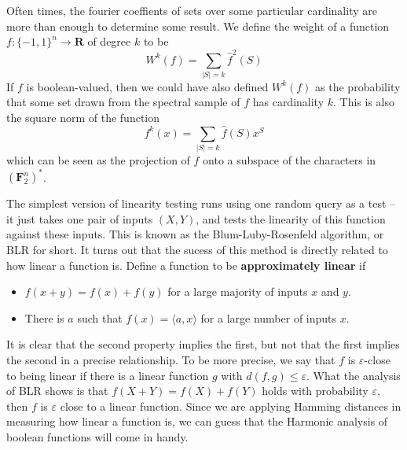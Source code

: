 Often times, the fourier coeffients of sets over some particular cardinality are more than enough to determine some result. We define the weight of a function $f: \{ -1, 1 \}^n \to \mathbf{R}$ of degree $k$ to be
%
\[ W^k(f) = \sum_{|S| = k} \widehat{f}^2(S) \]
%
If $f$ is boolean-valued, then we could have also defined $W^k(f)$ as the probability that some set drawn from the spectral sample of $f$ has cardinality $k$. This is also the square norm of the function
%
\[ f^k(x) = \sum_{|S| = k} \widehat{f}(S) x^S \]
%
which can be seen as the projection of $f$ onto a subspace of the characters in $(\mathbf{F}_2^n)^*$.

The simplest version of linearity testing runs using one random query as a test -- it just takes one pair of inputs $(X,Y)$, and tests the linearity of this function against these inputs. This is known as the Blum-Luby-Rosenfeld algorithm, or BLR for short. It turns out that the sucess of this method is directly related to how linear a function is. Define a function to be {\bf approximately linear} if
%
\begin{itemize}
    \item $f(x + y) = f(x) + f(y)$ for a large majority of inputs $x$ and $y$.
    \item There is $a$ such that $f(x) = \langle a, x \rangle$ for a large number of inputs $x$.
\end{itemize}
%
It is clear that the second property implies the first, but not that the first implies the second in a precise relationship. To be more precise, we say that $f$ is $\varepsilon$-close to being linear if there is a linear function $g$ with $d(f,g) \leq \varepsilon$. What the analysis of BLR shows is that $f(X + Y) = f(X) + f(Y)$ holds with probability $\varepsilon$, then $f$ is $\varepsilon$ close to a linear function. Since we are applying Hamming distances in measuring how linear a function is, we can guess that the Harmonic analysis of boolean functions will come in handy.

